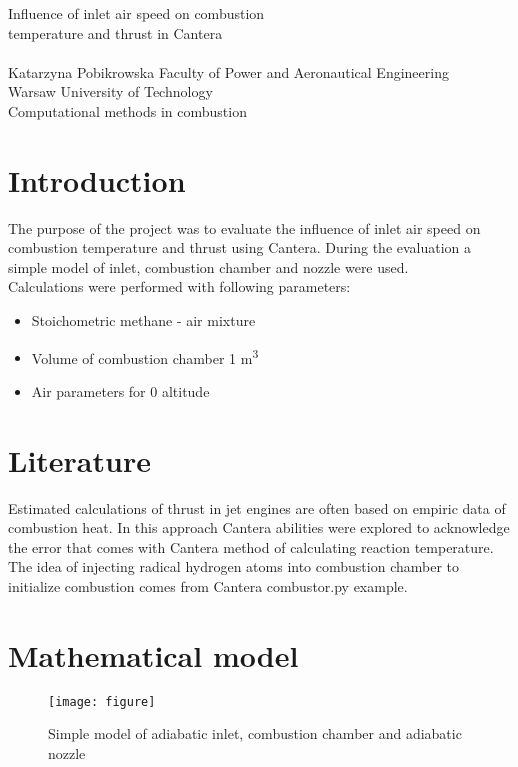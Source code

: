 \documentclass[a4paper, 12pt]{article}
\begin{document}

\hspace{0pt}
\vfill
\noindent
{\Huge Influence of inlet air speed on combustion\\ temperature and thrust in Cantera} \\\\
Katarzyna Pobikrowska
\vfill
\hspace{0pt}
{\centering
Faculty of Power and Aeronautical Engineering \\
Warsaw University of Technology \\
Computational methods in combustion \\
}


\newpage

\tableofcontents

\newpage

\section{Introduction}

The purpose of the project was to evaluate the influence of inlet air speed on combustion temperature and thrust using Cantera. During the evaluation a simple model of inlet, combustion chamber and nozzle were used.\\

Calculations were performed with following parameters:

\begin{itemize}
\item Stoichometric methane - air mixture
\item Volume of combustion chamber 1 m\textsuperscript{3}
\item Air parameters for 0 altitude
\end{itemize}

\section{Literature}

Estimated calculations of thrust in jet engines are often based on empiric data of combustion heat. In this approach Cantera abilities were explored to acknowledge the error that comes with Cantera method of calculating reaction temperature. The idea of injecting radical hydrogen atoms into combustion chamber to initialize combustion comes from Cantera combustor.py example.

\section{Mathematical model}
\begin{figure}[h]
\texttt{[image: figure]}
\caption{Simple model of adiabatic inlet, combustion chamber and adiabatic nozzle}
\end{figure}
\end{document}
